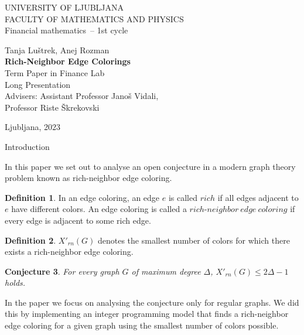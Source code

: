 \documentclass[12pt,a4paper]{amsart}
\makeatletter
\renewcommand\section{\@startsection{section}{1}
  \z@{.5\linespacing\@plus.7\linespacing}{.5\linespacing}
  {\normalfont\scshape\large\centering}}
\theoremstyle{definition} %
\newtheorem{definicija}{Definition}[section]
\theoremstyle{plain} %
\newtheorem{conjecture}[definicija]{Conjecture}
\newcommand{\program}{Financial mathematics} %
\newcommand{\imeavtorja}{Tanja Luštrek, Anej Rozman} %
\newcommand{\imementorja}{Assistant Professor Janoš Vidali} %
\newcommand{\imesomentorja}{Professor Riste Škrekovski}
\newcommand{\naslovdela}{Rich-Neighbor Edge Colorings}
\newcommand{\letnica}{2023} %
\makeatother
\begin{document}
\thispagestyle{empty}
{\large
\noindent UNIVERSITY OF LJUBLJANA\\[1mm]
FACULTY OF MATHEMATICS AND PHYSICS\\[5mm]
\program\ -- 1st cycle}
\vfill

\begin{center}{\large
\imeavtorja\\[2mm]
{\bf \naslovdela}\\[10mm]
Term Paper in Finance Lab\\[2mm]
Long Presentation\\[1cm]
Advisers: \imementorja, \\ \imesomentorja\\[2mm]}
\end{center}
\vfill

{\large
Ljubljana, \letnica}
\pagebreak

\thispagestyle{empty}
\tableofcontents
\pagebreak

\section{Introduction}

    In this paper we set out to analyse an open conjecture in a modern graph theory problem known as rich-neighbor edge coloring. 

    \begin{definicija}
        In an edge coloring, an edge $e$ is called $rich$ if all edges adjacent to $e$ have different colors. An edge coloring is 
        called a $rich\text{-}neighbor \ edge \ coloring$ if every edge is adjacent to some rich edge.
    \end{definicija}

    \begin{definicija}
        $X'_{rn}(G)$ denotes the smallest number of colors for which there exists a rich-neighbor edge coloring.
    \end{definicija}

    \begin{conjecture}
        For every graph $G$ of maximum degree $\Delta$, $X'_{rn}(G) \leq 2\Delta - 1$ holds.
    \end{conjecture}

    In the paper we focus on analysing the conjecture only for regular graphs. We did this by implementing an integer programming model that finds a rich-neighbor edge coloring for a given graph using the smallest number of colors possible.
\end{document}
